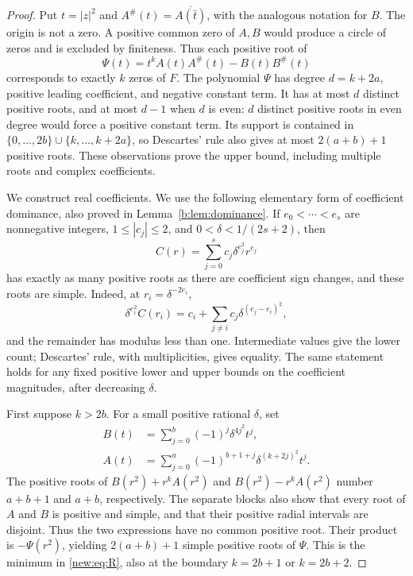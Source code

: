 \documentclass[UTF8,11pt]{ctexart}
\theoremstyle{definition}
\numberwithin{equation}{section}
\begin{document}
\begin{proof}
Put $t=|z|^2$ and $A^\#(t)=\overline{A(\bar t)}$, with the analogous
notation for $B$. The origin is not a zero. A positive common zero of
$A,B$ would produce a circle of zeros and is excluded by finiteness.
Thus each positive root of
\[
 \Psi(t)=t^k A(t)A^\#(t)-B(t)B^\#(t)
\]
corresponds to exactly $k$ zeros of $F$. The polynomial $\Psi$ has
degree $d=k+2a$, positive leading coefficient, and negative constant
term. It has at most $d$ distinct positive roots, and at most $d-1$
when $d$ is even: $d$ distinct positive roots in even degree would
force a positive constant term. Its support is contained in
$\{0,\ldots,2b\}\cup\{k,\ldots,k+2a\}$, so Descartes' rule also
gives at most $2(a+b)+1$ positive roots. These observations prove
the upper bound, including multiple roots and complex coefficients.

We construct real coefficients. We use the following elementary form
of coefficient dominance, also proved in Lemma~\ref{b:lem:dominance}.
If $e_0<\cdots<e_s$ are nonnegative integers,
$1\le |c_j|\le2$, and $0<\delta<1/(2s+2)$, then
\[
 C(r)=\sum_{j=0}^s c_j\delta^{e_j^2}r^{e_j}
\]
has exactly as many positive roots as there are coefficient sign changes,
and these roots are simple. Indeed, at $r_i=\delta^{-2e_i}$,
\[
 \delta^{e_i^2}C(r_i)
 =c_i+\sum_{j\ne i}c_j\delta^{(e_j-e_i)^2},
\]
and the remainder has modulus less than one. Intermediate values give
the lower count; Descartes' rule, with multiplicities, gives equality.
The same statement holds for any fixed positive lower and upper bounds
on the coefficient magnitudes, after decreasing $\delta$.

First suppose $k>2b$. For a small positive rational $\delta$, set
\begin{equation}\label{new:eq:disjointcoeffs}
 \begin{split}
 B(t)&=\sum_{j=0}^b(-1)^j\delta^{4j^2}t^j,\\
 A(t)&=\sum_{j=0}^a(-1)^{b+1+j}\delta^{(k+2j)^2}t^j.
 \end{split}
\end{equation}
The positive roots of $B(r^2)+r^kA(r^2)$ and
$B(r^2)-r^kA(r^2)$ number $a+b+1$ and $a+b$, respectively.
The separate blocks also show that every root of $A$ and $B$ is
positive and simple, and that their positive radial intervals are
disjoint. Thus the two expressions have no common positive root.
Their product is $-\Psi(r^2)$, yielding $2(a+b)+1$ simple positive
roots of $\Psi$. This is the minimum in \eqref{new:eq:R}, also at
the boundary $k=2b+1$ or $k=2b+2$.


\end{proof}
\end{document}
